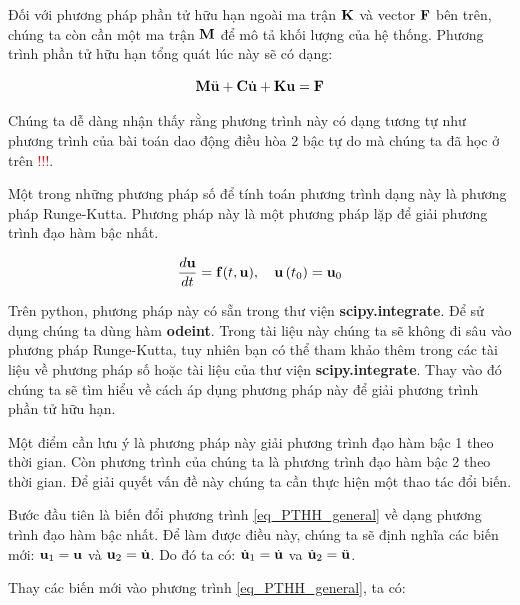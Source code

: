 Đối với phương pháp phần tử hữu hạn ngoài ma trận ${\bf K}$ và vector ${\bf F}$ bên trên, chúng ta còn cần một ma trận ${\bf M}$ để mô tả khối lượng của hệ thống. Phương trình phần tử hữu hạn tổng quát lúc này sẽ có dạng:


\begin{equation}\label{eq_PTHH_general}
    {\bf M}\ddot{\bf u} + {\bf C}\dot{\bf u} + {\bf K}{\bf u} = {\bf F}
\end{equation}

Chúng ta dễ dàng nhận thấy rằng phương trình này có dạng tương tự như phương trình của bài toán dao động điều hòa 2 bậc tự do mà chúng ta đã học ở trên \textcolor{red}{!!!}.

Một trong những phương pháp số để tính toán phương trình dạng này là phương pháp Runge-Kutta. Phương pháp này là một phương pháp lặp để giải phương trình đạo hàm bậc nhất.

\begin{equation}
    \frac{d {\bf u}}{d t}={\bf f}(t,{\bf u}) ,\quad {\bf u}\left(t_0\right)={\bf u}_0
\end{equation}

Trên python, phương pháp này có sẵn trong thư viện \textbf{scipy.integrate}. Để sử dụng chúng ta dùng hàm \textbf{odeint}. Trong tài liệu này chúng ta sẽ không đi sâu vào phương pháp Runge-Kutta, tuy nhiên bạn có thể tham khảo thêm trong các tài liệu về phương pháp số hoặc tài liệu của thư viện \textbf{scipy.integrate}. Thay vào đó chúng ta sẽ tìm hiểu về cách áp dụng phương pháp này để giải phương trình phần tử hữu hạn.

Một điểm cần lưu ý là phương pháp này giải phương trình đạo hàm bậc 1 theo thời gian. Còn phương trình của chúng ta là phương trình đạo hàm bậc 2 theo thời gian. Để giải quyết vấn đề này chúng ta cần thực hiện một thao tác đổi biến.

Bước đầu tiên là biến đổi phương trình \cref{eq_PTHH_general} về dạng phương trình đạo hàm bậc nhất. Để làm được điều này, chúng ta sẽ định nghĩa các biến mới: ${\bf u}_1 = {\bf u}$ và ${\bf u}_2 = \dot{\bf u}$. Do đó ta có: $\dot{\bf u}_1 = \dot{\bf u}$ va $\dot{\bf u}_2 = \ddot{\bf u}$.

Thay các biến mới vào phương trình \cref{eq_PTHH_general}, ta có:


